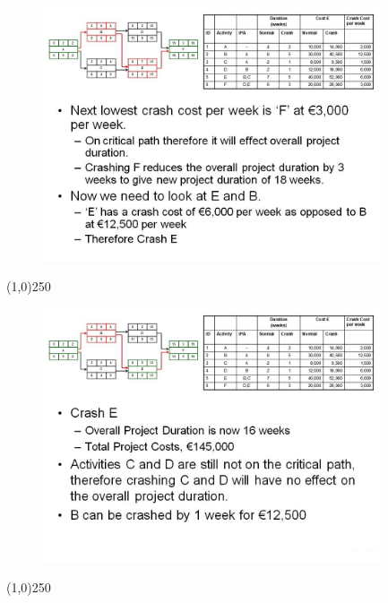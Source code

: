 \begin{frame}
\begin{figure}
	\centering
		\includegraphics[width = 10.0cm]{oldnotes/Slide358.jpg}
\end{figure}
\end{frame}
\begin{center}\line(1,0){250}\end{center}


\begin{frame}
\begin{figure}
	\centering
		\includegraphics[width = 10.0cm]{oldnotes/Slide359.jpg}
\end{figure}
\end{frame}
\begin{center}\line(1,0){250}\end{center}


